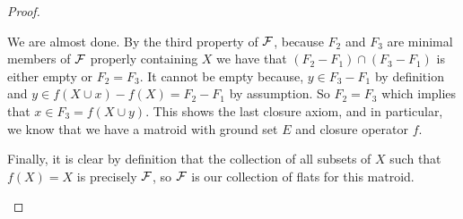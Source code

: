 \begin{proof}
\begin{enumerate}
     We are almost done. By the third property of $\mathcal{F}$, because $F_2$ and $F_3$ are minimal members of $\mathcal{F}$ properly containing $X$ we have that $(F_2-F_1)\cap (F_3 - F_1)$ is either empty or $F_2 = F_3$. It cannot be empty because, $y \in F_3 - F_1$ by definition and $y \in f(X\cup x)-f(X) = F_2 - F_1$ by assumption. So $F_2 = F_3$ which implies that $x \in F_3 = f(X \cup y).$ This shows the last closure axiom, and in particular, we know that we have a matroid with ground set $E$ and closure operator $f.$


     Finally, it is clear by definition that the collection of all subsets of $X$ such that $f(X) = X$ is precisely $\mathcal{F}$, so $\mathcal{F}$ is our collection of flats for this matroid.
     
\end{enumerate}


    
\end{proof}
